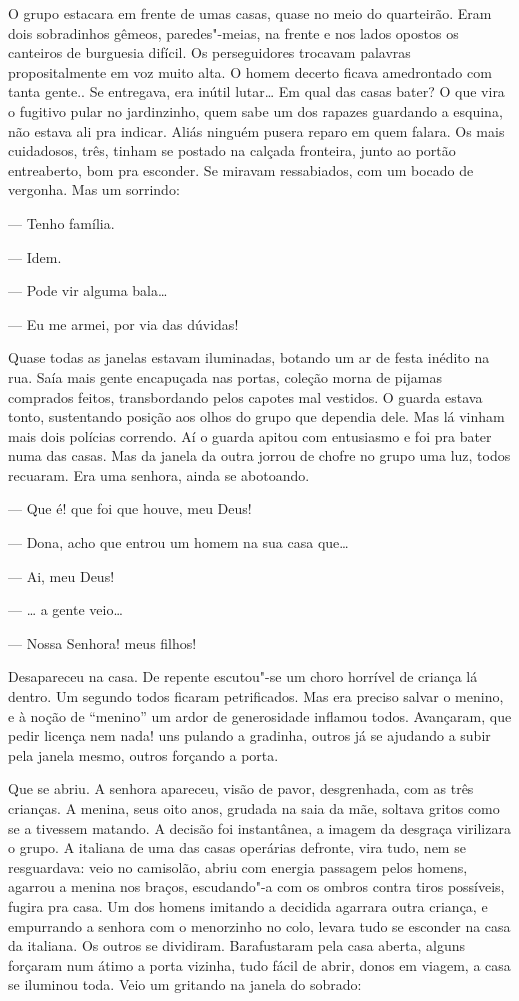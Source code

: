 \begin{linenumbers}
O grupo estacara em frente de umas casas, quase no meio do quarteirão.
Eram dois sobradinhos gêmeos, paredes"-meias, na frente e nos lados
opostos os canteiros de burguesia difícil. Os perseguidores trocavam
palavras propositalmente em voz muito alta. O homem decerto ficava
amedrontado com tanta gente.. Se entregava, era inútil lutar\ldots{} Em qual
das casas bater? O que vira o fugitivo pular no jardinzinho, quem sabe
um dos rapazes guardando a esquina, não estava ali pra indicar. Aliás
ninguém pusera reparo em quem falara. Os mais cuidadosos, três, tinham
se postado na calçada fronteira, junto ao portão entreaberto, bom pra
esconder. Se miravam ressabiados, com um bocado de vergonha. Mas um
sorrindo:

--- Tenho família.

--- Idem.

--- Pode vir alguma bala\ldots{}

--- Eu me armei, por via das dúvidas!

Quase todas as janelas estavam iluminadas, botando um ar de festa
inédito na rua. Saía mais gente encapuçada nas portas, coleção morna de
pijamas comprados feitos, transbordando pelos capotes mal vestidos. O
guarda estava tonto, sustentando posição aos olhos do grupo que dependia
dele. Mas lá vinham mais dois polícias correndo. Aí o guarda apitou com
entusiasmo e foi pra bater numa das casas. Mas da janela da outra jorrou
de chofre no grupo uma luz, todos recuaram. Era uma senhora, ainda se
abotoando.

--- Que é! que foi que houve, meu Deus!

--- Dona, acho que entrou um homem na sua casa que\ldots{}

--- Ai, meu Deus!

--- \ldots{} a gente veio\ldots{}

--- Nossa Senhora! meus filhos!

Desapareceu na casa. De repente escutou"-se um choro horrível de criança
lá dentro. Um segundo todos ficaram petrificados. Mas era preciso salvar
o menino, e à noção de ``menino'' um ardor de generosidade inflamou
todos. Avançaram, que pedir licença nem nada! uns pulando a gradinha,
outros já se ajudando a subir pela janela mesmo, outros forçando a
porta.

Que se abriu. A senhora apareceu, visão de pavor, desgrenhada, com as
três crianças. A menina, seus oito anos, grudada na saia da mãe, soltava
gritos como se a tivessem matando. A decisão foi instantânea, a imagem
da desgraça virilizara o grupo. A italiana de uma das casas operárias
defronte, vira tudo, nem se resguardava: veio no camisolão, abriu com
energia passagem pelos homens, agarrou a menina nos braços, escudando"-a
com os ombros contra tiros possíveis, fugira pra casa. Um dos homens
imitando a decidida agarrara outra criança, e empurrando a senhora com o
menorzinho no colo, levara tudo se esconder na casa da italiana. Os
outros se dividiram. Barafustaram pela casa aberta, alguns forçaram num
átimo a porta vizinha, tudo fácil de abrir, donos em viagem, a casa se
iluminou toda. Veio um gritando na janela do sobrado:


\end{linenumbers}
